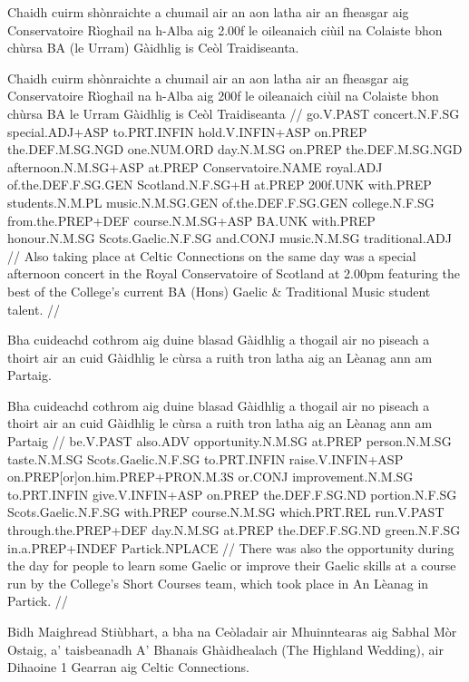 \documentclass[a4paper,10pt]{article}
\begin{document}
\ex
\begingl
\glpre Chaidh cuirm shònraichte a chumail air an aon latha air an fheasgar aig Conservatoire Rìoghail na h-Alba aig 2.00f le oileanaich ciùil na Colaiste bhon chùrsa BA (le Urram) Gàidhlig is Ceòl Traidiseanta. 

\vspace{4mm}
\gla Chaidh cuirm shònraichte a chumail air an aon latha air an fheasgar aig Conservatoire Rìoghail na h-Alba aig 200f le oileanaich ciùil na Colaiste bhon chùrsa BA le Urram Gàidhlig is Ceòl Traidiseanta  //
\glb go.V.PAST concert.N.F.SG special.ADJ+ASP to.PRT.INFIN hold.V.INFIN+ASP on.PREP the.DEF.M.SG.NGD one.NUM.ORD day.N.M.SG on.PREP the.DEF.M.SG.NGD afternoon.N.M.SG+ASP at.PREP Conservatoire.NAME royal.ADJ of.the.DEF.F.SG.GEN Scotland.N.F.SG+H at.PREP 200f.UNK with.PREP students.N.M.PL music.N.M.SG.GEN of.the.DEF.F.SG.GEN college.N.F.SG from.the.PREP+DEF course.N.M.SG+ASP BA.UNK with.PREP honour.N.M.SG Scots.Gaelic.N.F.SG and.CONJ music.N.M.SG traditional.ADJ  //
\glft Also taking place at Celtic Connections on the same day was a special afternoon concert in the Royal Conservatoire of Scotland at 2.00pm featuring the best of the College's current BA (Hons) Gaelic \& Traditional Music student talent. //
\endgl
\xe

\ex
\begingl
\glpre Bha cuideachd cothrom aig duine blasad Gàidhlig a thogail air no piseach a thoirt air an cuid Gàidhlig le cùrsa a ruith tron latha aig an Lèanag ann am Partaig. 

\vspace{4mm}
\gla Bha cuideachd cothrom aig duine blasad Gàidhlig a thogail air no piseach a thoirt air an cuid Gàidhlig le cùrsa a ruith tron latha aig an Lèanag {ann am} Partaig  //
\glb be.V.PAST also.ADV opportunity.N.M.SG at.PREP person.N.M.SG taste.N.M.SG Scots.Gaelic.N.F.SG to.PRT.INFIN raise.V.INFIN+ASP on.PREP[or]on.him.PREP+PRON.M.3S or.CONJ improvement.N.M.SG to.PRT.INFIN give.V.INFIN+ASP on.PREP the.DEF.F.SG.ND portion.N.F.SG Scots.Gaelic.N.F.SG with.PREP course.N.M.SG which.PRT.REL run.V.PAST through.the.PREP+DEF day.N.M.SG at.PREP the.DEF.F.SG.ND green.N.F.SG in.a.PREP+INDEF Partick.NPLACE  //
\glft There was also the opportunity during the day for people to learn some Gaelic or improve their Gaelic skills at a course run by the College's Short Courses team, which took place in An Lèanag in Partick. //
\endgl
\xe

\ex
\begingl
\glpre Bidh Maighread Stiùbhart, a bha na Ceòladair air Mhuinntearas aig Sabhal Mòr Ostaig, a' taisbeanadh A' Bhanais Ghàidhealach (The Highland Wedding),  air Dihaoine 1 Gearran aig Celtic Connections. 
\end{document}
